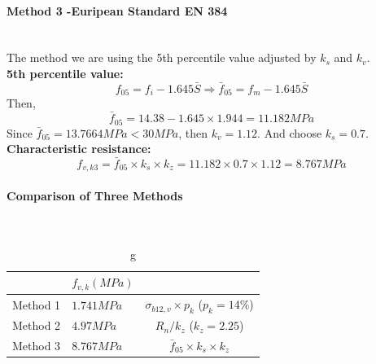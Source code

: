 \paragraph{Method 3 -Euripean Standard EN 384} \text{ } \\[2mm]
The method we are using the 5th percentile value adjusted by  $k_s$ and $k_v$. \\[4mm]
\textbf{5th percentile value:}
\[f_{05} = f_i - 1.645\bar{S} \Rightarrow \bar{f}_{05} = f_m - 1.645 \bar{S}\]
Then,
\[\bar{f}_{05} = 14.38 - 1.645\times 1.944 = 11.182 MPa\]
Since $\bar{f}_{05} = 13.7664 MPa <  30 MPa$, then $k_v = 1.12$. And choose $k_s = 0.7$. \\[2mm]
\textbf{Characteristic resistance:}
\[f_{v,k3} = \bar{f}_{05} \times k_s \times k_z = 11.182 \times 0.7 \times 1.12 = \boxed{8.767 MPa} \]
\paragraph{Comparison of Three Methods} \text{ } \\[2mm]
\begin{table}[H]
\centering
\begin{tabular}{LLC}
\hline
\color{blue}{Method}  & $f_{v,k} (MPa)$ & \color{blue}{Remark} \\\hline
Method 1 & $1.741 MPa$& $\sigma_{b12,v} \times p_k$ ($p_k = 14\%$)\\
Method 2 & $4.97 MPa$& $R_n / k_z$ ($k_z = 2.25$)\\
Method 3 & $8.767 MPa$& $\bar{f}_{05} \times k_s \times k_z$\\\hline
\end{tabular}

\caption{g}
\end{table}
